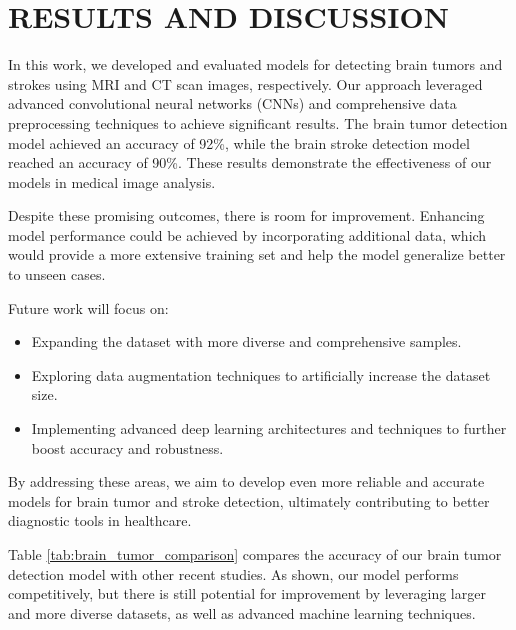 \documentclass[conference]{IEEEtran}
\begin{document}
 
\section{RESULTS AND DISCUSSION}

In this work, we developed and evaluated models for detecting brain tumors and strokes using MRI and CT scan images, respectively. 
Our approach leveraged advanced convolutional neural networks (CNNs) and comprehensive data preprocessing techniques to achieve significant results. 
The brain tumor detection model achieved an accuracy of 92\%, while the brain stroke detection model reached an accuracy of 90\%. These results demonstrate the effectiveness of our models in medical image analysis.

Despite these promising outcomes, there is room for improvement. 
Enhancing model performance could be achieved by incorporating additional data, which would provide a more extensive training set and help the model generalize better to unseen cases. 

Future work will focus on:
\begin{itemize}
    \item Expanding the dataset with more diverse and comprehensive samples.
    \item Exploring data augmentation techniques to artificially increase the dataset size.
    \item Implementing advanced deep learning architectures and techniques to further boost accuracy and robustness.
\end{itemize}

By addressing these areas, we aim to develop even more reliable and accurate models for brain tumor and stroke detection, ultimately contributing to better diagnostic tools in healthcare.

Table \ref{tab:brain_tumor_comparison} compares the accuracy of our brain tumor detection model with other recent studies. 
As shown, our model performs competitively, but there is still potential for improvement by leveraging larger and more diverse datasets, as well as advanced machine learning techniques.
\end{document}

